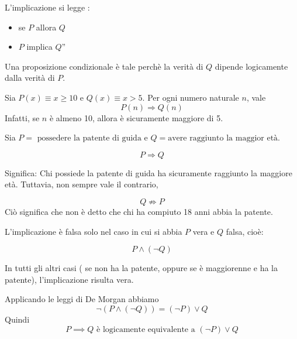 L'implicazione si legge : 
\begin{itemize}
    \item se $P$ allora $Q$
    \item $P$ implica $Q$”
\end{itemize}

 Una proposizione condizionale è tale perchè la verità di $Q$ dipende logicamente dalla verità di $P$.

\begin{esempio}
Sia $P(x) \equiv x \geq 10$  e  $Q(x) \equiv x > 5$. Per ogni numero naturale $n$, vale
    \[
    P(n) \Rightarrow Q(n)
    \]
    Infatti, se $n$ è almeno 10, allora è sicuramente maggiore di 5.
\end{esempio}

\begin{esempio}
    Sia $P = \text{ possedere la patente di guida}$ e $Q= \text{avere raggiunto la maggior età}$.
    
    \[
        P \Rightarrow Q
    \]
    
Significa: Chi possiede la patente di guida ha sicuramente raggiunto la maggiore età.
Tuttavia, non sempre vale il contrario,

\[
 Q \not\Rightarrow P
\]
Ciò significa che non è detto che chi ha compiuto 18 anni abbia la patente.

L'implicazione è falsa solo nel caso in cui si abbia \(P\) vera e \(Q\) falsa, cioè:

\[
    P \land(\neg Q)
\]

In tutti gli altri casi ( se non ha la patente, oppure se è maggiorenne e ha la patente), l'implicazione risulta vera.


Applicando le leggi di De Morgan abbiamo
\[
\neg(P \land(\neg Q)) = (\neg P) \lor Q
\]
Quindi 
\[
    P \implies Q \text{ è logicamente equivalente a } (\neg P) \lor Q
\]
\end{esempio}







